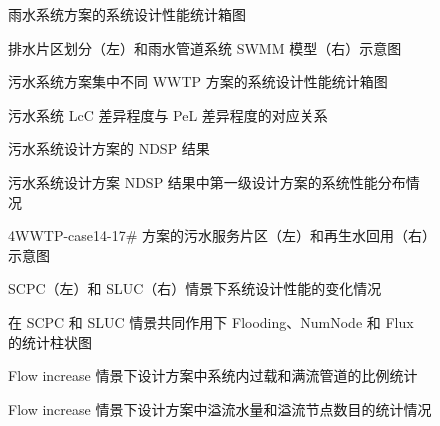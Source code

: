 \documentclass[degree=doctor]{thuthesis}
\begin{document}
\begin{figure}
  \centering
  \caption{雨水系统方案的系统设计性能统计箱图}
\end{figure}

\clearpage
\setcounter{page}{122}
\begin{figure}
  \centering
  \caption{排水片区划分（左）和雨水管道系统 SWMM 模型（右）示意图}
\end{figure}

\clearpage
\setcounter{page}{125}
\begin{figure}
  \centering
  \caption{污水系统方案集中不同 WWTP 方案的系统设计性能统计箱图}
\end{figure}

\clearpage
\setcounter{page}{126}
\begin{figure}
  \centering
  \caption{污水系统 LcC 差异程度与 PeL 差异程度的对应关系}
\end{figure}

\begin{figure}
  \centering
  \caption{污水系统设计方案的 NDSP 结果}
\end{figure}

\clearpage
\setcounter{page}{127}
\begin{figure}
  \centering
  \caption{污水系统设计方案 NDSP 结果中第一级设计方案的系统性能分布情况}
\end{figure}

\begin{figure}
  \centering
  \caption{4WWTP-case14-17\# 方案的污水服务片区（左）和再生水回用（右）示意图}
\end{figure}

\clearpage
\setcounter{page}{128}
\begin{figure}
  \centering
  \caption{SCPC（左）和 SLUC（右）情景下系统设计性能的变化情况}
\end{figure}

\clearpage
\setcounter{page}{130}
\begin{figure}
  \centering
  \caption{在 SCPC 和 SLUC 情景共同作用下 Flooding、NumNode 和 Flux 的统计柱状图}
\end{figure}

\clearpage
\setcounter{page}{131}
\begin{figure}
  \centering
  \caption{Flow increase 情景下设计方案中系统内过载和满流管道的比例统计}
\end{figure}

\clearpage
\setcounter{page}{132}
\begin{figure}
  \centering
  \caption{Flow increase 情景下设计方案中溢流水量和溢流节点数目的统计情况}
\end{figure}
\end{document}
